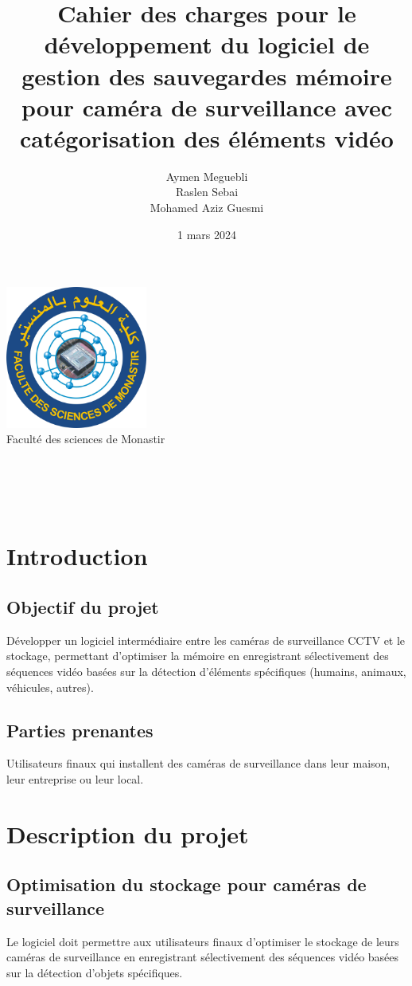 \documentclass{article}
\title{Cahier des charges pour le développement du logiciel de gestion des sauvegardes mémoire pour caméra de surveillance avec catégorisation des éléments vidéo}
\author{Aymen Meguebli \\ Raslen Sebai \\ Mohamed Aziz Guesmi}
\date{1 mars 2024}
\begin{document}
\begin{titlingpage}
\begin{center}
\includegraphics[width=0.35\textwidth]{fsm_logo}~\\[1cm]
{\LARGE Faculté des sciences de Monastir}\\[1.5cm]

\HRule \\[0.4cm]
{\huge \bfseries \thetitle \\[0.4cm]}
\HRule \\[1.5cm]

\large \theauthor \\[2cm]

\large \thedate
\end{center}
\end{titlingpage}

\tableofcontents
\clearpage

\section{Introduction}
\subsection{Objectif du projet}
Développer un logiciel intermédiaire entre les caméras de surveillance CCTV et le stockage, permettant d'optimiser la mémoire en enregistrant sélectivement des séquences vidéo basées sur la détection d'éléments spécifiques (humains, animaux, véhicules, autres).
\subsection{Parties prenantes}
Utilisateurs finaux qui installent des caméras de surveillance dans leur maison, leur entreprise ou leur local.

\section{Description du projet}
\subsection{Optimisation du stockage pour caméras de surveillance}
Le logiciel doit permettre aux utilisateurs finaux d'optimiser le stockage de leurs caméras de surveillance en enregistrant sélectivement des séquences vidéo basées sur la détection d'objets spécifiques.
\end{document}
